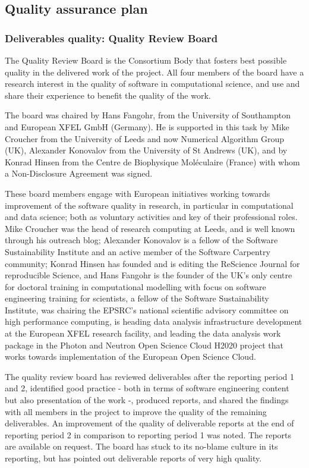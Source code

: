 \subsection{Quality assurance plan}
\label{section.QAP}

\subsubsection{Deliverables quality: Quality Review Board}

The Quality Review Board is the Consortium Body that fosters best
possible quality in the delivered work of the project.
All four members of the board
have a research interest in the quality of software in computational
science, and use and share their experience to benefit the quality of
the work.

The board was chaired by Hans Fangohr, from the University of
Southampton and European XFEL GmbH (Germany). He is supported in this task by
Mike Croucher from the University of Leeds and now
Numerical Algorithm Group (UK), Alexander Konovalov from
the University of St Andrews (UK), and by Konrad Hinsen from the Centre de
Biophysique Moléculaire (France) with whom a Non-Disclosure Agreement was
signed.

These board members engage with European initiatives working towards
improvement of the software quality in research, in particular in
computational and data science; both as voluntary activities and key
of their professional roles. Mike Croucher was the head of research
computing at Leeds, and is well known through his outreach blog; Alexander Konovalov
is a fellow of the Software Sustainability Institute and an active
member of the Software Carpentry community; Konrad Hinsen has
founded and is editing the ReScience Journal for reproducible Science,
and Hans Fangohr is the founder of the UK's only centre for
doctoral training in computational modelling with focus on software
engineering training for scientists, a fellow of the Software
Sustainability Institute, was chairing the EPSRC's national scientific
advisory committee on high performance computing, is heading
data analysis infrastructure development at the European XFEL research
facility, and leading the data analysis work package in the Photon and
Neutron Open Science Cloud H2020 project that works towards
implementation of the European Open Science Cloud.

The quality review board has reviewed deliverables after the reporting
period 1 and 2, identified good practice - both in terms of software
engineering content but also presentation of the work -, produced
reports, and shared the findings with all members in the project to
improve the quality of the remaining deliverables. An improvement of
the quality of deliverable reports at the end of reporting period 2 in
comparison to reporting period 1 was noted. The reports are available
on request. The board has stuck to its no-blame
culture in its reporting, but has pointed out deliverable reports of
very high quality.




